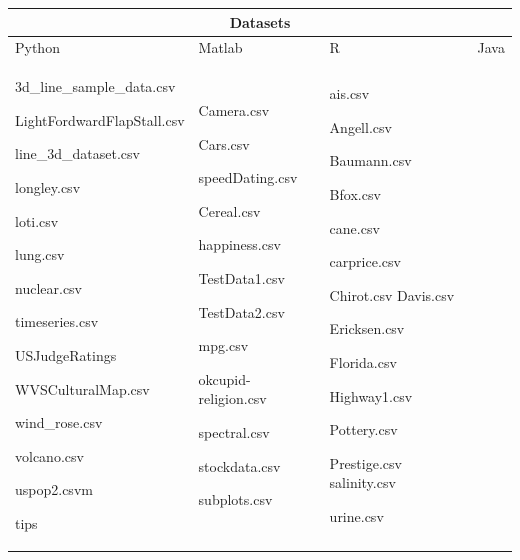 \documentclass[12pt, a4paper,oneside]{report}
\begin{document}
\begin{table}[!htbp]

	\centering
	
\begin{adjustbox}{max width=1.1\textwidth,center}
	
	\begin{tabular}{|p{5cm}|p{3cm}|p{3cm}|p{4cm}|}
		
		 \hline
		 \multicolumn{4}{|c|}{Datasets} \\
		 \hline
				
		Python & Matlab & R  & Java\\ \hline
		
		3d\_line\_sample\_data.csv \par LightFordwardFlapStall.csv  \par line\_3d\_dataset.csv \par
		longley.csv  \par loti.csv  \par lung.csv  \par nuclear.csv  \par timeseries.csv  \par
		USJudgeRatings	\par WVSCulturalMap.csv  \par wind\_rose.csv  \par volcano.csv  \par uspop2.csvm \par tips &
		
		Camera.csv \par Cars.csv \par speedDating.csv \par Cereal.csv  \par happiness.csv \par TestData1.csv \par TestData2.csv  \par mpg.csv \par okcupid-religion.csv  \par spectral.csv
		\par stockdata.csv \par subplots.csv  & 
		
		ais.csv \par Angell.csv  \par Baumann.csv \par Bfox.csv \par cane.csv \par carprice.csv \par Chirot.csv
		Davis.csv \par Ericksen.csv \par Florida.csv \par Highway1.csv \par Pottery.csv \par Prestige.csv 
		salinity.csv \par urine.csv & 
		

\end{tabular}
\end{adjustbox}
\end{table}
\end{document}
